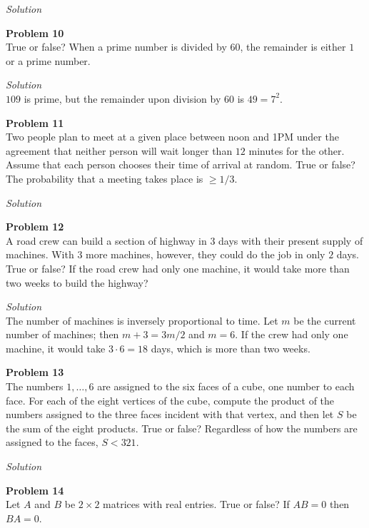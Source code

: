 \documentclass{amsart}
\begin{document}
\textit{Solution}

\textbf{Problem 10}\\
True or false? When a prime number is divided by $60$, the remainder is either $1$ or a prime number.

\textit{Solution}\\
$109$ is prime, but the remainder upon division by $60$ is $49 = 7^2$.

\textbf{Problem 11}\\
Two people plan to meet at a given place between noon and 1PM under the agreement that neither person will wait longer than $12$ minutes for the other.
Assume that each person chooses their time of arrival at random.
True or false? The probability that a meeting takes place is $\geq 1/3$.

\textit{Solution}

\textbf{Problem 12}\\
A road crew can build a section of highway in $3$ days with their present supply of machines.
With $3$ more machines, however, they could do the job in only $2$ days.
True or false? If the road crew had only one machine, it would take more than two weeks to build the highway?

\textit{Solution}\\
The number of machines is inversely proportional to time.
Let $m$ be the current number of machines; then $m + 3 = 3m/2$ and $m = 6$.
If the crew had only one machine, it would take $3 \cdot 6 = 18$ days, which is more than two weeks.

\textbf{Problem 13}\\
The numbers $1,\dots,6$ are assigned to the six faces of a cube, one number to each face.
For each of the eight vertices of the cube, compute the product of the numbers assigned to the three faces incident with that vertex, and then let $S$ be the sum of the eight products.
True or false? Regardless of how the numbers are assigned to the faces, $S < 321$.

\textit{Solution}

\textbf{Problem 14}\\
Let $A$ and $B$ be $2 \times 2$ matrices with real entries.
True or false? If $AB = 0$ then $BA = 0$.
\end{document}
